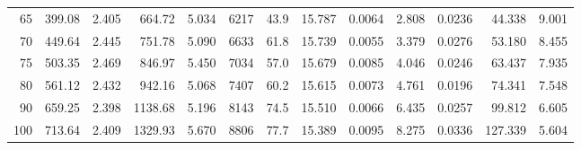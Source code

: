 \documentclass[10pt]{article}
\begin{document}
{\begin{tabular}{|r|rr|rr|rr|rr|rr|r|r|}
       65 &       399.08 &        2.405 &       664.72 &        5.034 &         6217 &         43.9 &       15.787 &       0.0064 &        2.808 &       0.0236 &       44.338 &        9.001 \\
       70 &       449.64 &        2.445 &       751.78 &        5.090 &         6633 &         61.8 &       15.739 &       0.0055 &        3.379 &       0.0276 &       53.180 &        8.455 \\
       75 &       503.35 &        2.469 &       846.97 &        5.450 &         7034 &         57.0 &       15.679 &       0.0085 &        4.046 &       0.0246 &       63.437 &        7.935 \\
       80 &       561.12 &        2.432 &       942.16 &        5.068 &         7407 &         60.2 &       15.615 &       0.0073 &        4.761 &       0.0196 &       74.341 &        7.548 \\
       90 &       659.25 &        2.398 &      1138.68 &        5.196 &         8143 &         74.5 &       15.510 &       0.0066 &        6.435 &       0.0257 &       99.812 &        6.605 \\
      100 &       713.64 &        2.409 &      1329.93 &        5.670 &         8806 &         77.7 &       15.389 &       0.0095 &        8.275 &       0.0336 &      127.339 &        5.604 \\
\hline
\end{tabular}
}







\pagebreak
\end{document}
